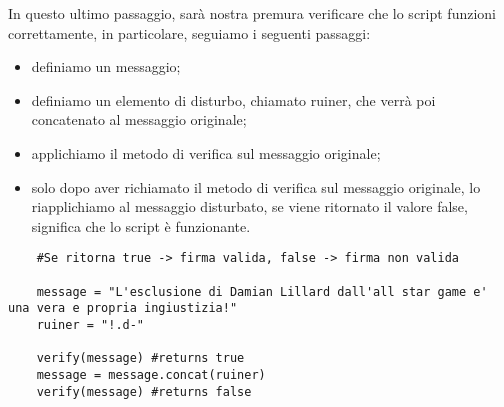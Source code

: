 In questo ultimo passaggio, sarà nostra premura verificare che lo script funzioni correttamente, in particolare, seguiamo i seguenti passaggi:
\begin{itemize}
	\item definiamo un messaggio;
	\item definiamo un elemento di disturbo, chiamato ruiner, che verrà poi concatenato al messaggio originale;
	\item applichiamo il metodo di verifica sul messaggio originale;
	\item solo dopo aver richiamato il metodo di verifica sul messaggio originale, lo riapplichiamo al messaggio disturbato, se viene ritornato il valore false, significa che lo script è funzionante.
\end{itemize}

\begin{lstlisting}
	#Se ritorna true -> firma valida, false -> firma non valida
	
	message = "L'esclusione di Damian Lillard dall'all star game e' una vera e propria ingiustizia!"
	ruiner = "!.d-"
	
	verify(message) #returns true 
	message = message.concat(ruiner)
	verify(message) #returns false
\end{lstlisting}
